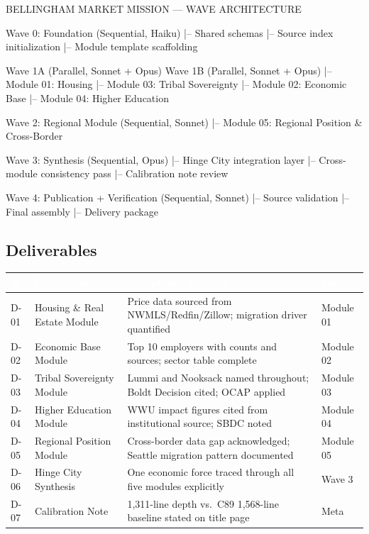 \documentclass[11pt,letterpaper]{article}
\newcommand{\tableheader}[1]{\textbf{\sffamily\textcolor{white}{#1}}}
\begin{document}
\begin{asciibox}
BELLINGHAM MARKET MISSION — WAVE ARCHITECTURE

Wave 0: Foundation (Sequential, Haiku)
  |-- Shared schemas
  |-- Source index initialization
  |-- Module template scaffolding

Wave 1A (Parallel, Sonnet + Opus)     Wave 1B (Parallel, Sonnet + Opus)
  |-- Module 01: Housing               |-- Module 03: Tribal Sovereignty
  |-- Module 02: Economic Base         |-- Module 04: Higher Education

Wave 2: Regional Module (Sequential, Sonnet)
  |-- Module 05: Regional Position & Cross-Border

Wave 3: Synthesis (Sequential, Opus)
  |-- Hinge City integration layer
  |-- Cross-module consistency pass
  |-- Calibration note review

Wave 4: Publication + Verification (Sequential, Sonnet)
  |-- Source validation
  |-- Final assembly
  |-- Delivery package
\end{asciibox}

\subsection{Deliverables}

\begin{center}
\begin{tabularx}{\textwidth}{C{0.7cm}L{3.5cm}XL{2.5cm}}
\toprule
{}
\tableheader{\#} & \tableheader{Deliverable} & \tableheader{Acceptance Criteria} & \tableheader{Spec} \\
\midrule
D-01 & Housing \& Real Estate Module & Price data sourced from NWMLS/Redfin/Zillow; migration driver quantified & Module 01 \\
D-02 & Economic Base Module & Top 10 employers with counts and sources; sector table complete & Module 02 \\
D-03 & Tribal Sovereignty Module & Lummi and Nooksack named throughout; Boldt Decision cited; OCAP applied & Module 03 \\
D-04 & Higher Education Module & WWU impact figures cited from institutional source; SBDC noted & Module 04 \\
D-05 & Regional Position Module & Cross-border data gap acknowledged; Seattle migration pattern documented & Module 05 \\
D-06 & Hinge City Synthesis & One economic force traced through all five modules explicitly & Wave 3 \\
D-07 & Calibration Note & 1,311-line depth vs.\ C89 1,568-line baseline stated on title page & Meta \\
\bottomrule
\end{tabularx}
\end{center}
\end{document}
